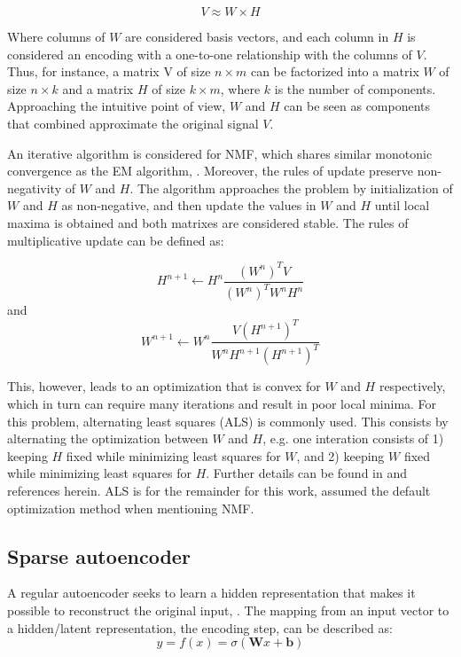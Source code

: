 \documentclass{article}
\begin{document}
\begin{equation}
V \approx W \times H
\end{equation}

Where columns of $W$ are considered basis vectors, and each column in $H$ is considered an encoding with a one-to-one relationship with the columns of $V$. Thus, for instance, a matrix V of size $n \times m$ can be factorized into a matrix $W$ of size $n \times k$ and a matrix $H$ of size $k \times m$, where $k$ is the number of components. Approaching the intuitive point of view, $W$ and $H$ can be seen as components that combined approximate the original signal $V$.

An iterative algorithm is considered for NMF, which shares similar monotonic convergence as the EM algorithm, \cite{Dempster1977}. Moreover, the rules of update preserve non-negativity of $W$ and $H$. The algorithm approaches the problem by initialization of $W$ and $H$ as non-negative, and then update the values in $W$ and $H$ until local maxima is obtained and both matrixes are considered stable. The rules of multiplicative update can be defined as:

\begin{equation}
H^{n+1} \leftarrow H^{n} \frac{(W^n)^TV}{(W^n)^TW^nH^n}
\end{equation}
and 
\begin{equation}
W^{n+1} \leftarrow W^{n} \frac{V(H^{n+1})^T}{W^{n}H^{n+1}(H^{n+1})^T}
\end{equation}

This, however, leads to an optimization that is convex for $W$ and $H$ respectively, which in turn can require many iterations and result in poor local minima. For this problem, alternating least squares (ALS) is commonly used. This consists by alternating the optimization between $W$ and $H$, e.g. one interation consists of 1) keeping $H$ fixed while minimizing least squares for $W$, and 2) keeping $W$ fixed while minimizing least squares for $H$. Further details can be found in  \cite{Langville2014} and references herein. ALS is for the remainder for this work, assumed the default optimization method when mentioning NMF.

\subsection{Sparse autoencoder}
A regular autoencoder seeks to learn a hidden representation that makes it possible to reconstruct the original input, \cite{Vincent}. The mapping from an input vector to a hidden/latent representation, the encoding step, can be described as:
\begin{equation}
y = f(x) = \sigma(\mathbf{W}x + \mathbf{b})
\end{equation}
\end{document}
